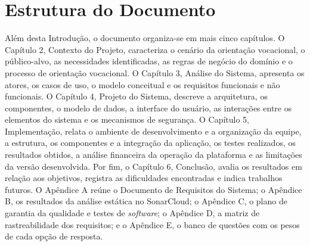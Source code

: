 \section{Estrutura do Documento}\label{sec:estrutura-documento}

Além desta Introdução, o documento organiza-se em mais cinco capítulos. O Capítulo 2, Contexto do Projeto, caracteriza o cenário da orientação vocacional, o público-alvo, as necessidades identificadas, as regras de negócio do domínio e o processo de orientação vocacional. O Capítulo 3, Análise do Sistema, apresenta os atores, os casos de uso, o modelo conceitual e os requisitos funcionais e não funcionais. O Capítulo 4, Projeto do Sistema, descreve a arquitetura, os componentes, o modelo de dados, a interface do usuário, as interações entre os elementos do sistema e os mecanismos de segurança. O Capítulo 5, Implementação, relata o ambiente de desenvolvimento e a organização da equipe, a estrutura, os componentes e a integração da aplicação, os testes realizados, os resultados obtidos, a análise financeira da operação da plataforma e as limitações da versão desenvolvida. Por fim, o Capítulo 6, Conclusão, avalia os resultados em relação aos objetivos, registra as dificuldades encontradas e indica trabalhos futuros. O Apêndice A reúne o Documento de Requisitos do Sistema; o Apêndice B, os resultados da análise estática no SonarCloud; o Apêndice C, o plano de garantia da qualidade e testes de \textit{software}; o Apêndice D, a matriz de rastreabilidade dos requisitos; e o Apêndice E, o banco de questões com os pesos de cada opção de resposta.
